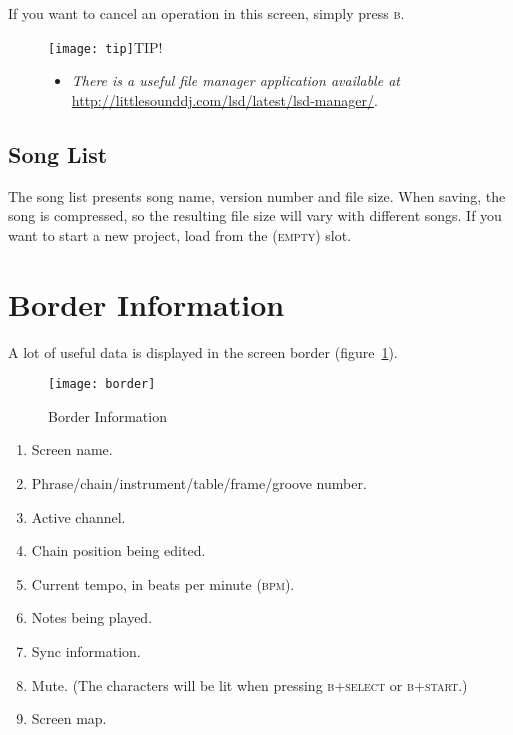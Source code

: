 If you want to cancel an operation in this screen, simply press \textsc{b}.

\begin{figure}[hbtp]
\texttt{[image: tip]}TIP!
\begin{itemize}
        \item \textit{There is a useful file manager application available at} \url{http://littlesounddj.com/lsd/latest/lsd-manager/}.
	\end{itemize}
\end{figure}

\subsection{Song List}

The song list presents song name, version number and file size. When saving, the song is compressed, so the resulting file size will vary with different songs. If you want to start a new project, load from the \textsc{(empty)} slot.

\section{Border Information}

A lot of useful data is displayed in the screen border (figure~\ref{fig:border}).

\begin{figure}[htpb]
	\begin{center}
	\texttt{[image: border]}
	\end{center}
	\caption{Border Information}
	\label{fig:border}
\end{figure}

\begin{enumerate}
\item Screen name.
\item Phrase/chain/instrument/table/frame/groove number.
\item Active channel.
\item Chain position being edited.
\item Current tempo, in beats per minute (\textsc{bpm}).
\item Notes being played.
\item Sync information.
\item Mute. (The characters will be lit when pressing \textsc{b+select} or \textsc{b+start}.)
\item Screen map.
\end{enumerate}



